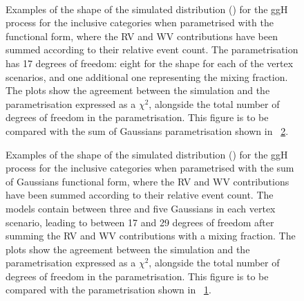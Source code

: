 \begin{figure}[htp!]
\centering
 \\
\caption{Examples of the shape of the simulated \mgg distribution (\GeV) for the ggH process for the inclusive categories when parametrised with the \DCBpG functional form, where the RV and WV contributions have been summed according to their relative event count. The parametrisation has 17 degrees of freedom: eight for the \DCBpG shape for each of the vertex scenarios, and one additional one representing the mixing fraction. The plots show the agreement between the simulation and the parametrisation expressed as a $\chi^2$, alongside the total number of degrees of freedom in the parametrisation. This figure is to be compared with the sum of Gaussians parametrisation shown in \Fig~\ref{fig:model:functionalform_bis}.}

\label{fig:model:functionalform}
\end{figure}
\begin{figure}[htp!]
\centering
\caption{Examples of the shape of the simulated \mgg distribution (\GeV) for the ggH process for the inclusive categories when parametrised with the sum of Gaussians functional form, where the RV and WV contributions have been summed according to their relative event count. The models contain between three and five Gaussians in each vertex scenario, leading to between 17 and 29 degrees of freedom after summing the RV and WV contributions with a mixing fraction. The plots show the agreement between the simulation and the parametrisation expressed as a $\chi^2$, alongside the total number of degrees of freedom in the parametrisation. This figure is to be compared with the \DCBpG parametrisation shown in \Fig~\ref{fig:model:functionalform}.}

\label{fig:model:functionalform_bis}
\end{figure}
